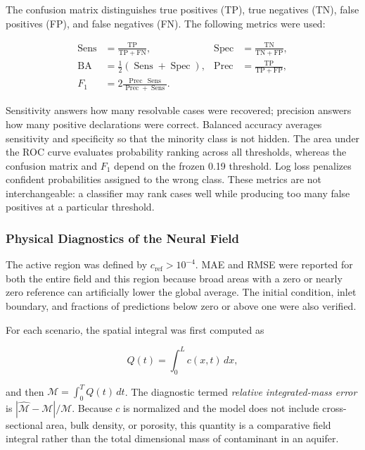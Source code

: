 \documentclass[11pt,a4paper]{article}
\begin{document}
The confusion matrix distinguishes true positives (TP), true negatives (TN),
false positives (FP), and false negatives (FN). The following metrics were
used:

\begin{align}
\operatorname{Sens}&=\frac{\mathrm{TP}}{\mathrm{TP}+\mathrm{FN}}, &
\operatorname{Spec}&=\frac{\mathrm{TN}}{\mathrm{TN}+\mathrm{FP}},\\
\operatorname{BA}&=\frac{1}{2}
(\operatorname{Sens}+\operatorname{Spec}), &
\operatorname{Prec}&=\frac{\mathrm{TP}}{\mathrm{TP}+\mathrm{FP}},\\
F_1&=2\frac{\operatorname{Prec}\,\operatorname{Sens}}
{\operatorname{Prec}+\operatorname{Sens}}.
\label{eq:classification-metrics}
\end{align}

Sensitivity answers how many resolvable cases were recovered; precision
answers how many positive declarations were correct. Balanced accuracy
averages sensitivity and specificity so that the minority class is not hidden.
The area under the ROC curve evaluates probability ranking across all
thresholds, whereas the confusion matrix and $F_1$ depend on the frozen 0.19
threshold. Log loss penalizes confident probabilities assigned to the wrong
class. These metrics are not interchangeable: a classifier may rank cases well
while producing too many false positives at a particular threshold.

\subsubsection{Physical Diagnostics of the Neural Field}

The active region was defined by $c_{\mathrm{ref}}>10^{-4}$. MAE and RMSE were
reported for both the entire field and this region because broad areas with a
zero or nearly zero reference can artificially lower the global average. The
initial condition, inlet boundary, and fractions of predictions below zero or
above one were also verified.

For each scenario, the spatial integral was first computed as

\begin{equation}
Q(t)=\int_0^L c(x,t)\,dx,
\end{equation}

and then $\mathcal M=\int_0^TQ(t)\,dt$. The diagnostic termed \emph{relative
integrated-mass error} is
$|\widehat{\mathcal M}-\mathcal M|/\mathcal M$. Because $c$ is normalized and
the model does not include cross-sectional area, bulk density, or porosity,
this quantity is a comparative field integral rather than the total
dimensional mass of contaminant in an aquifer.
\end{document}
